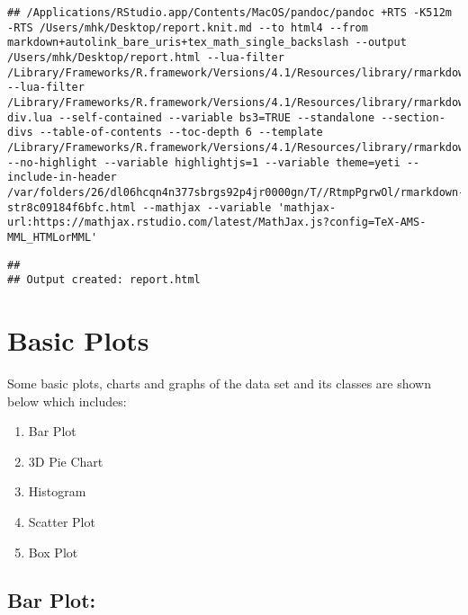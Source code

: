 \documentclass[
]{article}
\newenvironment{Shaded}{\begin{snugshade}}{\end{snugshade}}
\newcommand{\AttributeTok}[1]{\textcolor[rgb]{0.77,0.63,0.00}{#1}}
\newcommand{\CommentTok}[1]{\textcolor[rgb]{0.56,0.35,0.01}{\textit{#1}}}
\newcommand{\DecValTok}[1]{\textcolor[rgb]{0.00,0.00,0.81}{#1}}
\newcommand{\FunctionTok}[1]{\textcolor[rgb]{0.00,0.00,0.00}{#1}}
\newcommand{\NormalTok}[1]{#1}
\newcommand{\SpecialCharTok}[1]{\textcolor[rgb]{0.00,0.00,0.00}{#1}}
\newcommand{\StringTok}[1]{\textcolor[rgb]{0.31,0.60,0.02}{#1}}
\providecommand{\tightlist}{%
  \setlength{\itemsep}{0pt}\setlength{\parskip}{0pt}}
\begin{document}
\begin{verbatim}
## /Applications/RStudio.app/Contents/MacOS/pandoc/pandoc +RTS -K512m -RTS /Users/mhk/Desktop/report.knit.md --to html4 --from markdown+autolink_bare_uris+tex_math_single_backslash --output /Users/mhk/Desktop/report.html --lua-filter /Library/Frameworks/R.framework/Versions/4.1/Resources/library/rmarkdown/rmarkdown/lua/pagebreak.lua --lua-filter /Library/Frameworks/R.framework/Versions/4.1/Resources/library/rmarkdown/rmarkdown/lua/latex-div.lua --self-contained --variable bs3=TRUE --standalone --section-divs --table-of-contents --toc-depth 6 --template /Library/Frameworks/R.framework/Versions/4.1/Resources/library/rmarkdown/rmd/h/default.html --no-highlight --variable highlightjs=1 --variable theme=yeti --include-in-header /var/folders/26/dl06hcqn4n377sbrgs92p4jr0000gn/T//RtmpPgrwOl/rmarkdown-str8c09184f6bfc.html --mathjax --variable 'mathjax-url:https://mathjax.rstudio.com/latest/MathJax.js?config=TeX-AMS-MML_HTMLorMML'
\end{verbatim}

\begin{verbatim}
## 
## Output created: report.html
\end{verbatim}

\hypertarget{basic-plots}{%
\section{Basic Plots}\label{basic-plots}}

Some basic plots, charts and graphs of the data set and its classes are
shown below which includes:

\begin{enumerate}
\def\labelenumi{\arabic{enumi})}
\tightlist
\item
  Bar Plot
\item
  3D Pie Chart
\item
  Histogram
\item
  Scatter Plot
\item
  Box Plot
\end{enumerate}

\hypertarget{bar-plot}{%
\subsection{Bar Plot:}\label{bar-plot}}

\begin{Shaded}
\end{Shaded}
\end{document}
